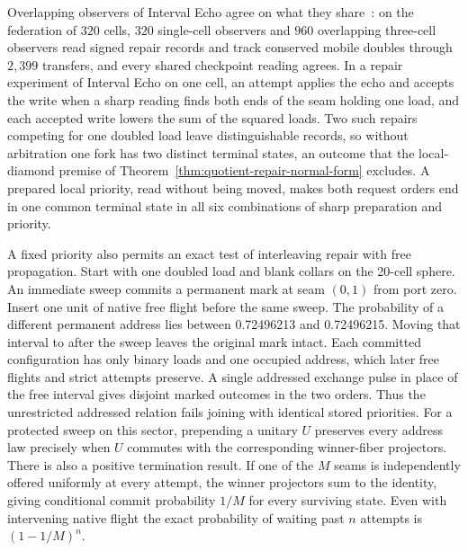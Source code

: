 \documentclass[11pt]{article}
\theoremstyle{remark}
\theoremstyle{plain}
\begin{document}
Overlapping observers of Interval Echo agree on what they
share~\cite{ophmodel}: on the federation of $320$ cells, $320$ single-cell
observers and $960$ overlapping three-cell observers read signed repair
records and track conserved mobile doubles through $2{,}399$ transfers, and
every shared checkpoint reading agrees. In a repair experiment of Interval
Echo on one cell, an attempt applies the echo and accepts the write when a
sharp reading finds both ends of the seam holding one load, and each
accepted write lowers the sum of the squared loads. Two such repairs
competing for one doubled load leave distinguishable records, so without
arbitration one fork has two distinct terminal states, an outcome that the
local-diamond premise of Theorem~\ref{thm:quotient-repair-normal-form}
excludes. A prepared local priority, read without being moved, makes both
request orders end in one common terminal state in all six combinations of
sharp preparation and priority.

A fixed priority also permits an exact test of interleaving repair with
free propagation. Start with one doubled load and blank collars on the
20-cell sphere. An immediate sweep commits a permanent mark at seam
\((0,1)\) from port zero. Insert one unit of native free flight before
the same sweep. The probability of a different permanent address lies
between 0.72496213 and 0.72496215. Moving that interval to after the
sweep leaves the original mark intact. Each committed configuration has
only binary loads and one occupied address, which later free flights
and strict attempts preserve. A single addressed exchange pulse in
place of the free interval gives disjoint marked outcomes in the two
orders. Thus the unrestricted addressed relation fails joining with
identical stored priorities. For a protected sweep on this sector,
prepending a unitary \(U\) preserves every address law precisely when
\(U\) commutes with the corresponding winner-fiber projectors.
There is also a positive termination result. If one of the \(M\) seams
is independently offered uniformly at every attempt, the winner
projectors sum to the identity, giving conditional commit probability
\(1/M\) for every surviving state. Even with intervening native flight
the exact probability of waiting past \(n\) attempts is
\((1-1/M)^n\).
\end{document}
